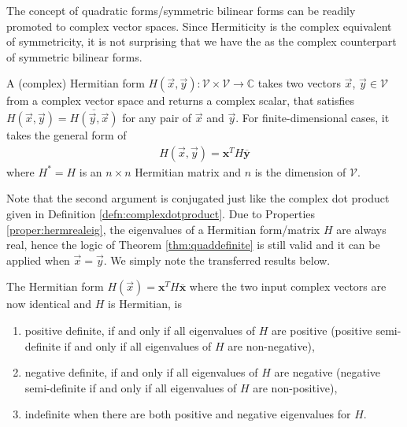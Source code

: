The concept of quadratic forms/symmetric bilinear forms can be readily promoted to complex vector spaces. Since Hermiticity is the complex equivalent of symmetricity, it is not surprising that we have the  as the complex counterpart of symmetric bilinear forms.
\begin{defn}
A (complex) Hermitian form $H(\vec{x}, \vec{y}): \mathcal{V} \times \mathcal{V} \to \mathbb{C}$ takes two vectors $\vec{x}$, $\vec{y} \in \mathcal{V}$ from a complex vector space and returns a complex scalar, that satisfies $H(\vec{x}, \vec{y}) = \overline{H(\vec{y}, \vec{x})}$ for any pair of $\vec{x}$ and $\vec{y}$. For finite-dimensional cases, it takes the general form of
\begin{align*}
H(\vec{x}, \vec{y}) = \textbf{x}^T H \overline{\textbf{y}}    
\end{align*}
where $H^* = H$ is an $n \times n$ Hermitian matrix and $n$ is the dimension of $\mathcal{V}$.
\end{defn}
Note that the second argument is conjugated just like the complex dot product given in Definition \ref{defn:complexdotproduct}. Due to Properties \ref{proper:hermrealeig}, the eigenvalues of a Hermitian form/matrix $H$ are always real, hence the logic of Theorem \ref{thm:quaddefinite} is still valid and it can be applied when $\vec{x} = \vec{y}$. We simply note the transferred results below.
\begin{thm}
\label{thm:hermdefinite}
The Hermitian form $H(\vec{x}) = \textbf{x}^T H \overline{\textbf{x}}$ where the two input complex vectors are now identical and $H$ is Hermitian, is
\begin{enumerate}[label=(\alph*)]
\item positive definite, if and only if all eigenvalues of $H$ are positive (positive semi-definite if and only if all eigenvalues of $H$ are non-negative), 
\item negative definite, if and only if all eigenvalues of $H$ are negative (negative semi-definite if and only if all eigenvalues of $H$ are non-positive), 
\item indefinite when there are both positive and negative eigenvalues for $H$.
\end{enumerate}
\end{thm}

